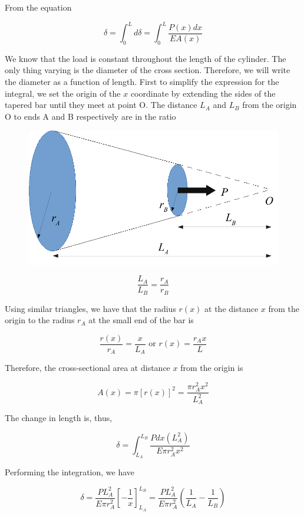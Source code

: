 \documentclass[
10pt,
a4paper,
openany,
svgnames,
]{book} %
\begin{document}
\begin{solution}
  From the equation
  
\[\delta  = \int_0^L {d\delta }  = \int_0^L {\frac{{P(x)dx}}{{EA(x)}}} \]

We know that the load is constant throughout the length of the cylinder. The only thing varying is the diameter of the cross section. Therefore, we will write the diameter as a function of length.
First to simplify the expression for the integral, we set the origin of the $x$ coordinate by extending the sides of the tapered bar until they meet at point O.
The distance $L_A$ and $L_B$ from the origin O to ends A and B respectively are in the ratio

\begin{figure}[H]
  \centering
  \includegraphics[scale=0.6]{pictures/Axial-load/axial-load-cone-mod}
\end{figure}

\[\frac{L_A}{L_B} = \frac{r_A}{r_B}\]	

Using similar triangles, we have that the radius $r(x)$ at the distance $x$ from the origin to the radius $r_A$ at the small end of the bar is

\[\frac{r(x)}{r_A} = \frac{x}{L_A} \text{  or  } r(x) = \frac{r_Ax}{L}\]	

Therefore, the cross-sectional area at distance $x$ from the origin is

\[A(x) = \pi [r(x)]^2 = \frac{\pi r_A^2x^2}{L_A^2}\]

The change in length is, thus,

\[\delta  = \int_{L_A}^{L_B} \frac{Pdx(L_A^2)}{E\pi r_A^2x^2} \]

Performing the integration, we have

\[\delta  = \frac{{PL_A^2}}{{E\pi r_A^2}}\left[ { - \frac{1}{x}} \right]_{{L_A}}^{{L_B}} = \frac{{PL_A^2}}{{E\pi r_A^2}}\left( {\frac{1}{{{L_A}}} - \frac{1}{{{L_B}}}} \right)\]	


\end{solution}
\end{document}
